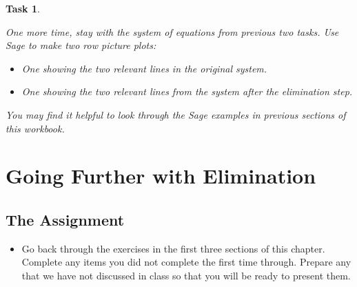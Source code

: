 \documentclass[10pt,]{book}
\theoremstyle{plain}
\numberwithin{equation}{section}
\newtheorem{task}{Task}[chapter]
\begin{document}
\begin{task}
\label{task-54}

      One more time, stay with the system of equations from previous two tasks.
      Use Sage to make two row picture plots:
\begin{itemize}
\item{} One showing the two relevant lines in the original system.\item{} One showing the two relevant lines from the system after the elimination step.\end{itemize}
\par

      You may find it helpful to look through the Sage examples in previous sections
      of this workbook.
\end{task}
\clearpage
\typeout{************************************************}
\typeout{************************************************}
\section[Going Further with Elimination]{Going Further with Elimination}\label{lin-eq-going-further-1}
\typeout{************************************************}
\typeout{************************************************}
\subsection[The Assignment]{The Assignment}\label{subsection-34}
\begin{itemize}
\item{}
        Go back through the exercises in the first three sections of this chapter.
        Complete any items you
        did not complete the first time through. Prepare any that we have not
        discussed in class so that you will be ready to present them.
      \end{itemize}
\typeout{************************************************}
\typeout{************************************************}
\end{document}
